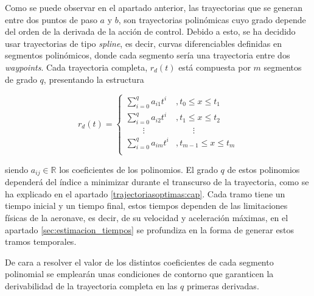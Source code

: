 Como se puede observar en el apartado anterior, las trayectorias que se generan entre dos puntos de paso $a$ y $b$, son trayectorias polinómicas cuyo grado depende del orden de la derivada de la acción de control. Debido a esto, se ha decidido usar trayectorias de tipo \textit{spline}, es decir, curvas diferenciables definidas en segmentos polinómicos, donde cada segmento sería una trayectoria entre dos \textit{waypoints}. Cada trayectoria completa, $r_d(t)$ está compuesta por $m$ segmentos de grado $q$, presentando la estructura

\begin{equation}
	r_d(t) = \left\{ 
	\begin{array}{ll}
		\sum_{i=0}^{q}a_{i1}t^{i} &,t_0\leq x \leq t_1 \\
		\sum_{i=0}^{q}a_{i2}t^{i} &,t_1\leq x \leq t_2 \\
		\qquad\vdots &\qquad\vdots \\
		\sum_{i=0}^{q}a_{im}t^{i} &,t_{m-1}\leq x \leq t_m \\
	\end{array}
	\right.
\end{equation}

siendo $a_{ij}\in \mathbb{R}$ los coeficientes de los polinomios. El grado $q$ de estos polinomios dependerá del índice a minimizar durante el transcurso de la trayectoria, como se ha explicado en el apartado \ref{trajectoriasoptimas:cap}. Cada tramo tiene un tiempo inicial y un tiempo final, estos tiempos dependen de las limitaciones físicas de la aeronave, es decir, de su velocidad y aceleración máximas, en el apartado \ref{sec:estimacion_tiempos} se profundiza en la forma de generar estos tramos temporales.

De cara a resolver el valor de los distintos coeficientes de cada segmento polinomial se emplearán unas condiciones de contorno que garanticen la derivabilidad de la trayectoria completa en las $q$ primeras derivadas. 

